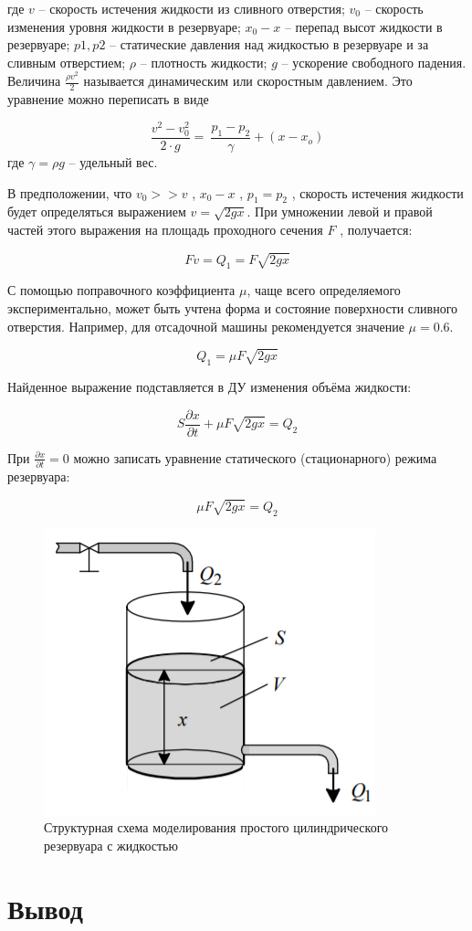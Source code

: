 \documentclass[a4paper, 12pt]{article}
\begin{document}
где $v$ -- скорость истечения жидкости из сливного отверстия; $v_0$ -- скорость изменения уровня жидкости в резервуаре; $x_0 - x$ -- перепад высот жидкости в резервуаре; $p1, p2$ -- статические давления над жидкостью в резервуаре и за сливным отверстием; $\rho$ -- плотность жидкости; $g$ -- ускорение свободного падения. Величина $\frac{\rho v^2}{2}$ называется динамическим или скоростным давлением. Это уравнение можно переписать в виде

$$\frac{v^2-v_0^2}{2 \cdot g}=\ \frac{p_1-p_2}{\gamma}+\left(x-x_o\right)$$
где $\gamma = \rho g$ -- удельный вес.

В предположении, что $v_0 >> v$ , $x_0 - x$ , $p_1 = p_2$ , скорость истечения жидкости будет определяться выражением $v = \sqrt{2 g x}$. При умножении левой и правой частей этого выражения на площадь проходного сечения $F$ , получается: 

$$ Fv = Q_1 = F \sqrt{2gx} $$

С помощью поправочного коэффициента $\mu$, чаще всего определяемого экспериментально, может быть учтена форма и состояние поверхности сливного отверстия. Например, для отсадочной машины рекомендуется значение $\mu = 0.6$.

$$Q_1=\mu F\sqrt{2gx}$$

Найденное выражение подставляется в ДУ изменения объёма жидкости: 

$$ S \frac{\partial x}{\partial t} + \mu F \sqrt{2gx} = Q_2 $$

При $\frac{\partial x}{\partial t} = 0$ можно записать уравнение статического (стационарного) режима резервуара:

$$ \mu F \sqrt{2gx} = Q_2$$

\begin{figure}[h!]
	\centering
	\includegraphics[scale=0.8]{example_1}
	\caption{Структурная схема моделирования простого цилиндрического резервуара с жидкостью}
	\label{p:Простой_цилиндрический_резервуар}
\end{figure}

\section{Вывод}

 
\end{document}
